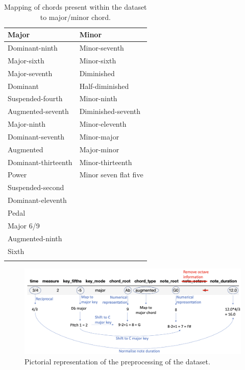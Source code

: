         \begin{table}
            \caption{Mapping of chords present within the dataset to major/minor chord.}
            \label{tab:chords}
            \centering
            \begin{tabular}{l l}
            \toprule
            Major & Minor \\
            \midrule
            Dominant-ninth & Minor-seventh\\
            Major-sixth & Minor-sixth\\
            Major-seventh & Diminished\\
            Dominant & Half-diminished\\
            Suspended-fourth & Minor-ninth\\
            Augmented-seventh & Diminished-seventh\\
            Major-ninth & Minor-eleventh\\
            Dominant-seventh & Minor-major\\
            Augmented & Major-minor\\
            Dominant-thirteenth & Minor-thirteenth\\
            Power & Minor seven flat five\\
            Suspended-second &  \\
            Dominant-eleventh &  \\
            Pedal &  \\
            Major 6/9 &  \\
            Augmented-ninth &  \\
            Sixth &  \\

            \bottomrule\\
            \end{tabular}
            \end{table}
            

        \begin{figure}
            \centering
            \includegraphics[scale=0.3]{Figures/Algorithm pictorial2}
            \decoRule
            \caption{Pictorial representation of the preprocessing of the dataset.
            }
            \label{fig:Alg1}
            \end{figure}
            
